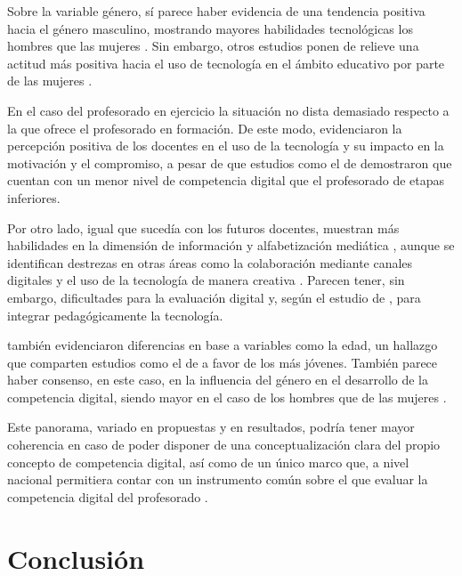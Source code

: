 \documentclass[spanish]{textolivre}
\begin{document}
Sobre la variable género, sí parece haber evidencia de una tendencia positiva hacia el género masculino, mostrando mayores habilidades tecnológicas los hombres que las mujeres \cite{ortega-sanchez_self-perception_2020}. Sin embargo, otros estudios ponen de relieve una actitud más positiva hacia el uso de tecnología en el ámbito educativo por parte de las mujeres \cite{gomez_carrasco_estrategias_2020}.

En el caso del profesorado en ejercicio la situación no dista demasiado respecto a la que ofrece el profesorado en formación. De este modo, \textcite{anes2018pizarra} evidenciaron la percepción positiva de los docentes en el uso de la tecnología y su impacto en la motivación y el compromiso, a pesar de que estudios como el de \textcite{fuentes_alisis_2019} demostraron que cuentan con un menor nivel de competencia digital que el profesorado de etapas inferiores.

Por otro lado, igual que sucedía con los futuros docentes, muestran más habilidades en la dimensión de información y alfabetización mediática \cite{lopez_belmonte_pedagogical_2020}, aunque se identifican destrezas en otras áreas como la colaboración mediante canales digitales y el uso de la tecnología de manera creativa \cite{moreno_guerrero_competencia_2021}. Parecen tener, sin embargo, dificultades para la evaluación digital \cite{fernandez_miravete_evaluacion_2021} y, según el estudio de \textcite{miguel-revilla_assessing_2020}, para integrar pedagógicamente la tecnología.

\textcite{aznar_diaz_alfabetizacion_2019} también evidenciaron diferencias en base a variables como la edad, un hallazgo que comparten estudios como el de \textcite{lopez_belmonte_pedagogical_2020} a favor de los más jóvenes. También parece haber consenso, en este caso, en la influencia del género en el desarrollo de la competencia digital, siendo mayor en el caso de los hombres que de las mujeres \cite{lopez_belmonte_alisis_2019, portillo_self-perception_2020}.

Este panorama, variado en propuestas y en resultados, podría tener mayor coherencia en caso de poder disponer de una conceptualización clara del propio concepto de competencia digital, así como de un único marco que, a nivel nacional permitiera contar con un instrumento común sobre el que evaluar la competencia digital del profesorado \cite{herrero2023reflexiones}.


\section{Conclusión}
\end{document}
